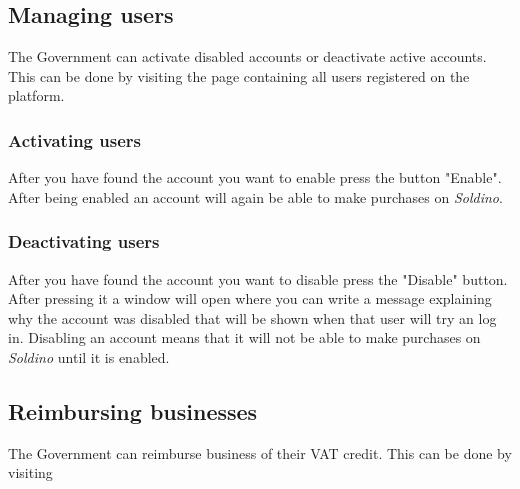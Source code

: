 	\subsection{Managing users}
	The Government can activate disabled accounts or deactivate active accounts.
	This can be done by visiting the page containing all users registered on the
	platform.
%	
		\subsubsection{Activating users}
		After you have found the account you want to enable press the button 
		"Enable". After being enabled an account will again be able to make 
		purchases on \textit{Soldino}.
%		
		\subsubsection{Deactivating users}
		After you have found the account you want to disable press the 
		"Disable" button. After pressing it a window will open where you can 
		write a	message explaining why the account was disabled that will be 
		shown when that user will try an log in. Disabling an account 
		means that it will not be able to make purchases on \textit{Soldino} 
		until it is enabled.
%		
	\subsection{Reimbursing businesses}
	The Government can reimburse business of their VAT credit. This can be done 
	by visiting
%	